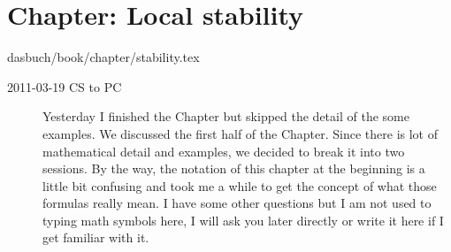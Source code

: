 \section{Chapter: Local stability}\noindent dasbuch/book/chapter/stability.tex
\begin{description}

\item[2011-03-19 CS to PC]
Yesterday I finished the Chapter but skipped the detail of the some
examples. We discussed the first half of the Chapter. Since there is lot
of mathematical detail and examples, we decided to break it into two
sessions. By the way, the notation of this chapter at the beginning is a
little bit confusing and took me a while to get the concept of what those
formulas really mean. I have some other questions but I am not used to
typing math symbols here, I will ask you later directly or write it here
if I get familiar with it.

\end{description}

